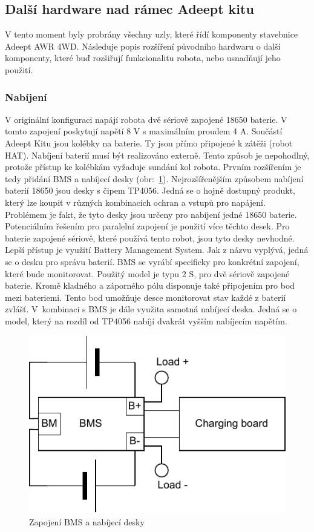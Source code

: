 \subsection*{Další hardware nad rámec Adeept kitu}
V tento moment byly probrány všechny uzly, které řídí komponenty stavebnice Adeept AWR 4WD. Následuje popis rozšíření původního hardwaru o další komponenty, které buď rozšiřují funkcionalitu robota, nebo usnadňují jeho použití.

\subsubsection*{Nabíjení}
V originální konfiguraci napájí robota dvě sériově zapojené 18650 baterie. V tomto zapojení poskytují napětí 8 V s maximálním proudem 4 A. Součástí Adeept Kitu jsou kolébky na baterie. Ty jsou přímo připojené k zátěži (robot HAT). Nabíjení baterií musí být realizováno externě. Tento způsob je nepohodlný, protože přístup ke kolébkám vyžaduje sundání kol robota. Prvním rozšířením je tedy přidání BMS a nabíjecí desky (obr:~\ref{fig:battery}). 
Nejrozšířenějším způsobem nabíjení baterií 18650 jsou desky s čipem TP4056. Jedná se o hojně dostupný produkt, který lze koupit v různých kombinacích ochran a vstupů pro napájení. Problémem je fakt, že tyto desky jsou určeny pro nabíjení jedné 18650 baterie. Potenciálním řešením pro paralelní zapojení je použití více těchto desek. Pro baterie zapojené sériově, které používá tento robot, jsou tyto desky nevhodné.
Lepší přístup je využití Battery Management System. Jak z názvu vyplývá, jedná se o desku pro správu baterií. BMS se vyrábí specificky pro konkrétní zapojení, které bude monitorovat. Použitý model je typu 2 S, pro dvě sériově zapojené baterie. Kromě kladného a záporného pólu disponuje také připojením pro bod mezi bateriemi. Tento bod umožňuje desce monitorovat stav každé z baterií zvlášť.
V~kombinaci s BMS je dále využita samotná nabíjecí deska. Jedná se o model, který na rozdíl od TP4056 nabíjí dvakrát vyšším nabíjecím napětím.

\begin{figure}[h!]
	\centering
	\includegraphics[scale=0.75]{obrazky-figures/battery_circuite.pdf}
	\caption{Zapojení BMS a nabíjecí desky}
	\label{fig:battery}
\end{figure}

